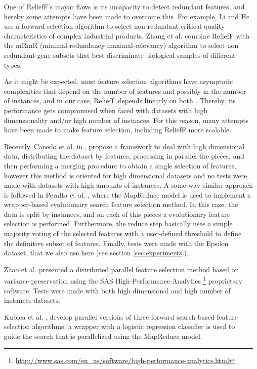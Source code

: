 One of ReliefF's mayor flaws is its incapacity to detect redundant features, and hereby some attempts have been made to overcome this. For example, Li and He \cite{Li2016} use a forward selection algorithm to select non redundant critical quality characteristics of complex industrial products. Zhang et al. \cite{Zhang2008} combine ReliefF with the mRmR (minimal-redundancy-maximal-relevancy) algorithm \cite{Peng2005} to select non redundant gene subsets that best discriminate biological samples of different types. 

As it might be expected, most feature selection algorithms have asymptotic complexities that depend on the number of features and possibly in the number of instances, and in our case, ReliefF depends linearly on both \cite{Robnik2003}. Thereby, its performance gets compromised when faced with datasets with high dimensionality and/or high number of instances. For this reason, many attempts have been made to make feature selection, including ReliefF more scalable.

Recently, Canedo et al. in \cite{Bolon-Canedo2015}, propose a framework to deal with high dimensional data, distributing the dataset by features, processing in parallel the pieces, and then performing a merging procedure to obtain a single selection of features, however this method is oriented for high dimensional datasets and no tests were made with datasets with high amounts of instances. A some way similar approach is followed in Peralta et al. \cite{Peralta2015}, where the MapReduce model is used to implement a wrapper-based evolutionary search feature selection method. In this case, the data is split by instances, and on each of this pieces a evolutionary feature selection is performed. Furthermore, the reduce step basically uses a simple majority voting of the selected features with a user-defined threshold to define the definitive subset of features. Finally, tests were made with the Epsilon dataset, that we also use here (see section \ref{sec:experiments}).

Zhao et al. \cite{Zhao2012} presented a distributed parallel feature selection method based on variance preservation using the SAS High-Performance Analytics \footnote{\url{http://www.sas.com/en_us/software/high-performance-analytics.html}} proprietary software. Tests were made with both high dimensional and high number of instances datasets.

Kubica et al. \cite{Kubica2011}, develop parallel versions of three forward search based feature selection algorithms, a wrapper with a logistic regression classifier is used to guide the search that is parallelized using the MapReduce model.

